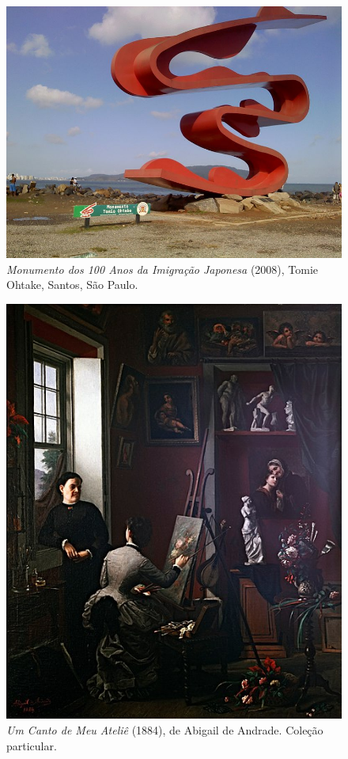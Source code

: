 \begin{figure}[htpb!]
\includegraphics[width=.5\textwidth]{./imgs/art4c.jpg}
\caption{\emph{Monumento dos 100 Anos da Imigração Japonesa} (2008), Tomie Ohtake, Santos, São Paulo.}
\end{figure}
\begin{figure}[htpb!]
\includegraphics[width=.5\textwidth]{./imgs/art4d.jpg}
\caption{\emph{Um Canto de Meu Ateliê} (1884), de Abigail de Andrade. Coleção particular.}
\end{figure}

